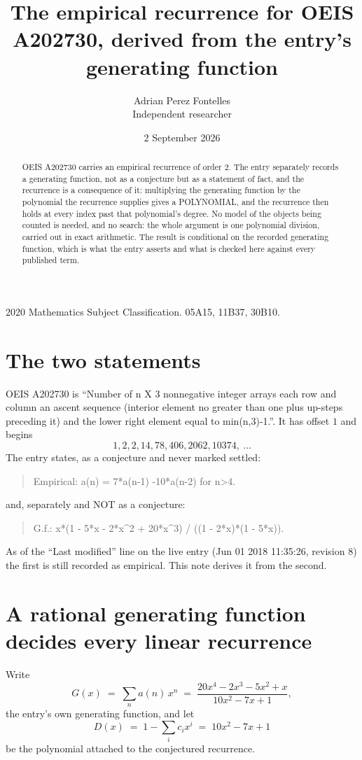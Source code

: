\documentclass[11pt,a4paper]{article}
\title{The empirical recurrence for OEIS A202730, derived from the entry's generating function}
\author{Adrian Perez Fontelles\\ \small Independent researcher}
\date{2 September 2026}
\theoremstyle{plain}
\theoremstyle{definition}
\begin{document}
\maketitle

\begin{abstract}
OEIS A202730 carries an empirical recurrence of order $2$. The entry separately records a
generating function, not as a conjecture but as a statement of fact, and the recurrence is a
consequence of it: multiplying the generating function by the polynomial the recurrence
supplies gives a POLYNOMIAL, and the recurrence then holds at every index past that
polynomial's degree. No model of the objects being counted is needed, and no search: the
whole argument is one polynomial division, carried out in exact arithmetic. The result is
conditional on the recorded generating function, which is what the entry asserts and what is
checked here against every published term.
\end{abstract}

\noindent\small 2020 Mathematics Subject Classification. 05A15, 11B37, 30B10.\normalsize

\section{The two statements}

OEIS A202730 is ``Number of n X 3 nonnegative integer arrays each row and column an ascent sequence (interior element no greater than one plus up-steps preceding it) and the lower right element equal to min(n,3)-1.''. It has offset $1$ and begins
\[
1, 2, 2, 14, 78, 406, 2062, 10374,\ \dots
\]
The entry states, as a conjecture and never marked settled:
\begin{quote}
Empirical: a(n) = 7*a(n-1) -10*a(n-2) for n>4.
\end{quote}
and, separately and NOT as a conjecture:
\begin{quote}
G.f.: x*(1 - 5*x - 2*x\^{}2 + 20*x\^{}3) / ((1 - 2*x)*(1 - 5*x)).
\end{quote}
As of the ``Last modified'' line on the live entry (Jun 01 2018 11:35:26, revision 8) the first is still
recorded as empirical. This note derives it from the second.

\section{A rational generating function decides every linear recurrence}

Write
\[
G(x)\;=\;\sum_{n}a(n)\,x^{n}\;=\;\frac{20 x^{4} - 2 x^{3} - 5 x^{2} + x}{10 x^{2} - 7 x + 1},
\]
the entry's own generating function, and let
\[
D(x)\;=\;1-\sum_i c_i x^{i}\;=\;10 x^{2} - 7 x + 1
\]
be the polynomial attached to the conjectured recurrence.
\end{document}
